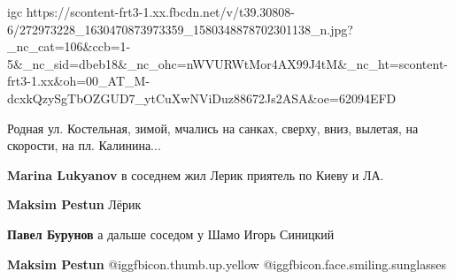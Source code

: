 \ifcmt
  igc https://scontent-frt3-1.xx.fbcdn.net/v/t39.30808-6/272973228_1630470873973359_1580348878702301138_n.jpg?_nc_cat=106&ccb=1-5&_nc_sid=dbeb18&_nc_ohc=nWVURWtMor4AX99J4tM&_nc_ht=scontent-frt3-1.xx&oh=00_AT_M-dcxkQzySgTbOZGUD7_ytCuXwNViDuz88672Js2ASA&oe=62094EFD
\fi


Родная ул. Костельная, зимой, мчались на санках, сверху, вниз, вылетая, на
скорости, на пл. Калинина...

\textbf{Marina Lukyanov} в соседнем жил Лерик приятель по Киеву и ЛА.

\textbf{Maksim Pestun} Лёрик

\textbf{Павел Бурунов} а дальше соседом у Шамо Игорь Синицкий

\textbf{Maksim Pestun}  @igg{fbicon.thumb.up.yellow}  @igg{fbicon.face.smiling.sunglasses} 
